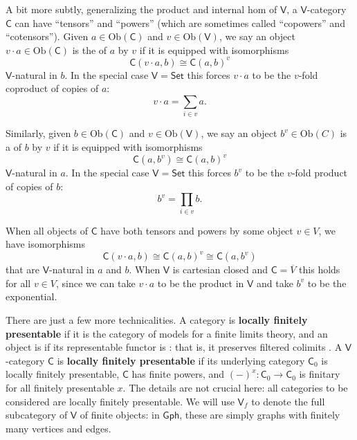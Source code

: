 \documentclass{amsart}
\newcommand{\define}[1]{{\bf \boldmath{#1}}}
\theoremstyle{definition}
\newcommand{\Gph}{\mathsf{Gph}}
\newcommand{\Set}{\mathsf{Set}}
\newcommand{\V}{\mathsf{V}}
\newcommand{\C}{\mathsf{C}}
\newcommand{\op}{\mathrm{op}}
\newcommand{\Obj}{\mathrm{Ob}}
\newcommand{\maps}{\colon}
\begin{document}
A bit more subtly, generalizing the product and internal hom of $\V$, a $\V$-category $\C$ can
have ``tensors'' and ``powers'' (which are sometimes called ``copowers'' and ``cotensors'').
Given $a \in \Obj(\C)$ and $v \in \Obj(\V)$, we say an object $v \cdot a \in \Obj(\C)$ is the \define{tensor} of $a$ by $v$ if it is equipped with isomorphisms
\[
	\C(v\cdot a,b) \cong  \C(a,b)^v
\]
$\V$-natural in $b$.
In the special case $\V = \Set$ this forces $v \cdot a$ to be the $v$-fold coproduct 
of copies of $a$:
\[       v \cdot a = \sum_{i \in v} a . \]
\iffalse
In general, if we can choose a tensor product $v \cdot a$ for all $v \in \V$, $a \in \C$
we say $\C$ is \textbf{$\V$-tensored}, and we obtain a $\V$-functor
\[
\begin{array}{ccl}
  \underline{\V} \times \C  &\to& \C \\
 (v,a) &\mapsto & v \cdot a. \\
\end{array}
\]
For example, $\underline{\V}$ is always $\V$-tensored via the cartesian product
$ \times \maps \underline{\V} \times \underline{\V} \to \underline{\V} $.
\fi
Similarly, given $b \in \Obj(\C)$ and $v \in \Obj(\V)$, we say an object $b^v \in \Obj(C)$ is a \define{power} of $b$ by $v$ if it is equipped with isomorphisms
\[
		 \C(a,b^v) \cong \C(a,b)^v
\]
$\V$-natural in $a$.  
In the special case $\V = \Set$  this forces $b^v$ to be the $v$-fold product of copies of $b$:
\[          b^v = \prod_{i \in v} b . \]
\iffalse
In general, if we can choose a power $b^v$ for all $b \in C$, $v \in \V$,
we say $\C$ is \textbf{$\V$-powered}, and we obtain a $\V$-functor
\[
\begin{array}{ccl}
 \C \times \underline{\V}^\op  &\to& \C \\
 (b, v) &\mapsto & b^v .\\
\end{array}
\]
\fi
When all objects of $\C$ have both tensors and powers by some object $v \in V$, we have isomorphisms
\[
	\C(v\cdot a,b) \cong \C(a,b)^v \cong \C(a, b^v)
\]
that are $\V$-natural in $a$ and $b$.  When $\V$ is cartesian closed and $\C = \overline{V}$
this holds for all $v \in V$, since we can take $v \cdot a$ to be the product in $\V$ and take
$b^v$ to be the exponential.


There are just a few more technicalities. A category is \textbf{locally finitely presentable} if it is the category of models for a finite limits theory, and an object is \define{finite} if its representable functor is \define{finitary}: that is, it preserves filtered colimits \cite{adamekrosicky}.   A $\V$-category $\C$ is \textbf{locally finitely presentable} if its underlying category $\C_0$ is locally finitely presentable, $\C$ has finite powers, and $(-)^x\maps \C_0 \to \C_0$ is finitary for all finitely presentable $x$.  The details are not crucial here: all categories to be considered are locally finitely presentable. We will use  $\V_f$ to denote the full subcategory of $\V$ of finite objects: in $\Gph$, these are simply graphs with finitely many vertices and edges.
\end{document}
